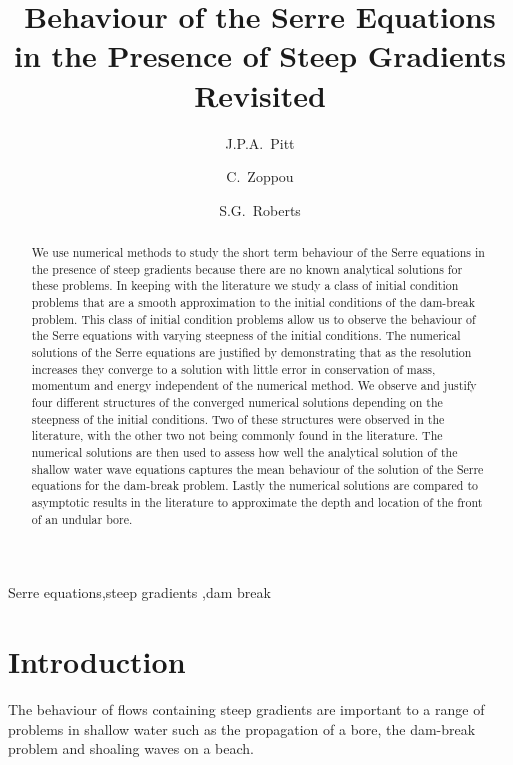 \documentclass[times]{elsarticle}
\begin{document}
\title{Behaviour of the Serre Equations in the Presence of Steep Gradients Revisited}

\author[ANU]{J.P.A.~Pitt}
\author[ANU]{C.~Zoppou}
\author[ANU]{S.G.~Roberts}

\address[ANU]{Mathematical Sciences Institute, Australian National University, Canberra, ACT 0200, Australia}
 \begin{abstract}
 We use numerical methods to study the short term behaviour of the Serre equations in the presence of steep gradients because there are no known analytical solutions for these problems. In keeping with the literature we study a class of initial condition problems that are a smooth approximation to the initial conditions of the dam-break problem. This class of initial condition problems allow us to observe the behaviour of the Serre equations with varying steepness of the initial conditions. The numerical solutions of the Serre equations are justified by demonstrating that as the resolution increases they converge to a solution with little error in conservation of mass, momentum and energy independent of the numerical method. We observe and justify four different structures of the converged numerical solutions depending on the steepness of the initial conditions. Two of these structures were observed in the literature, with the other two not being commonly found in the literature. The numerical solutions are then used to assess how well the analytical solution of the shallow water wave equations captures the mean behaviour of the solution of the Serre equations for the dam-break problem. Lastly the numerical solutions are compared to asymptotic results in the literature to approximate the depth and location of the front of an undular bore.
 \end{abstract}	
 
  \begin{keyword}
  	Serre equations\sep steep gradients \sep dam break
  \end{keyword}
  
 \maketitle
\linenumbers
\section{Introduction} \label{intro} 
The behaviour of flows containing steep gradients are important to a range of problems in shallow water such as the propagation of a bore, the dam-break problem and shoaling waves on a beach.
\end{document}

